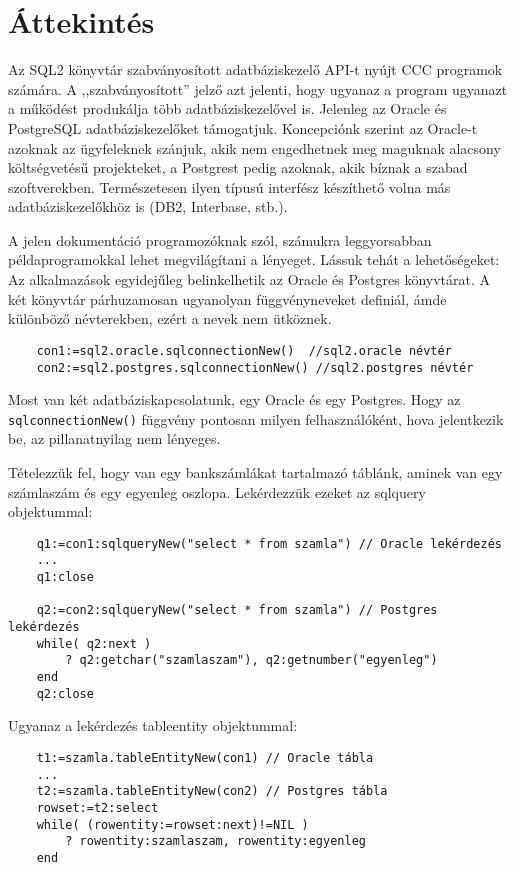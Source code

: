 
\section{Áttekintés}

Az SQL2 könyvtár szabványosított adatbáziskezelő API-t nyújt  
CCC programok számára. A ,,szabványosított'' jelző azt jelenti, 
hogy ugyanaz a program ugyanazt a működést produkálja több 
adatbáziskezelővel is. Jelenleg az Oracle és PostgreSQL 
adatbáziskezelőket támogatjuk. 
Koncepciónk szerint az Oracle-t azoknak az ügyfeleknek szánjuk, 
akik nem engedhetnek meg maguknak  alacsony költségvetésű 
projekteket, a Postgrest pedig azoknak, akik bíznak a szabad szoftverekben. 
Természetesen ilyen típusú interfész készíthető volna más adatbáziskezelőkhöz 
is (DB2, Interbase, stb.).

A jelen dokumentáció programozóknak szól, számukra
leggyorsabban példaprogramokkal lehet megvilágítani
a lényeget. Lássuk tehát a lehetőségeket:
Az alkalmazások egyidejűleg belinkelhetik az Oracle és Postgres
könyvtárat. A két könyvtár párhuzamosan ugyanolyan függvényneveket 
definiál, ámde különböző  névterekben, ezért a nevek nem ütköznek.

\begin{verbatim}
    con1:=sql2.oracle.sqlconnectionNew()  //sql2.oracle névtér
    con2:=sql2.postgres.sqlconnectionNew() //sql2.postgres névtér
\end{verbatim}


Most van két adatbáziskapcsolatunk, egy Oracle és 
egy  Postgres. Hogy az \verb!sqlconnectionNew()! függvény
pontosan milyen felhasználóként, hova jelentkezik be,
az pillanatnyilag nem lényeges.

Tételezzük fel, 
hogy van egy bankszámlákat tartalmazó táblánk,
aminek van egy számlaszám és egy egyenleg oszlopa.
Lekérdezzük ezeket az sqlquery objektummal:

\begin{verbatim}
    q1:=con1:sqlqueryNew("select * from szamla") // Oracle lekérdezés
    ...
    q1:close

    q2:=con2:sqlqueryNew("select * from szamla") // Postgres lekérdezés
    while( q2:next )
        ? q2:getchar("szamlaszam"), q2:getnumber("egyenleg")
    end
    q2:close
\end{verbatim}

Ugyanaz a lekérdezés tableentity objektummal:

\begin{verbatim}
    t1:=szamla.tableEntityNew(con1) // Oracle tábla
    ...
    t2:=szamla.tableEntityNew(con2) // Postgres tábla
    rowset:=t2:select
    while( (rowentity:=rowset:next)!=NIL )
        ? rowentity:szamlaszam, rowentity:egyenleg 
    end
\end{verbatim}
    

